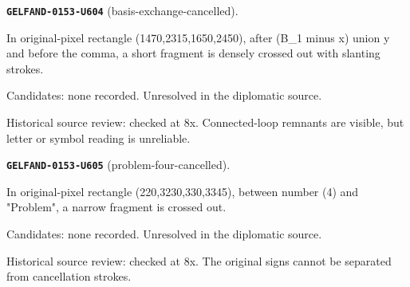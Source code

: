 \par\noindent\leavevmode{}\label{GELFAND-0153-U604}\textbf{\texttt{GELFAND-0153-U604}} (basis-exchange-cancelled).\nopagebreak[4]\par
In original-pixel rectangle (1470,2315,1650,2450), after (B\_1 minus x) union y and before the comma, a short fragment is densely crossed out with slanting strokes.\par
Candidates: none recorded. Unresolved in the diplomatic source.\par
Historical source review: checked at 8x. Connected-loop remnants are visible, but letter or symbol reading is unreliable.\par\medskip
\par\noindent\leavevmode{}\label{GELFAND-0153-U605}\textbf{\texttt{GELFAND-0153-U605}} (problem-four-cancelled).\nopagebreak[4]\par
In original-pixel rectangle (220,3230,330,3345), between number (4) and "Problem", a narrow fragment is crossed out.\par
Candidates: none recorded. Unresolved in the diplomatic source.\par
Historical source review: checked at 8x. The original signs cannot be separated from cancellation strokes.\par\medskip
